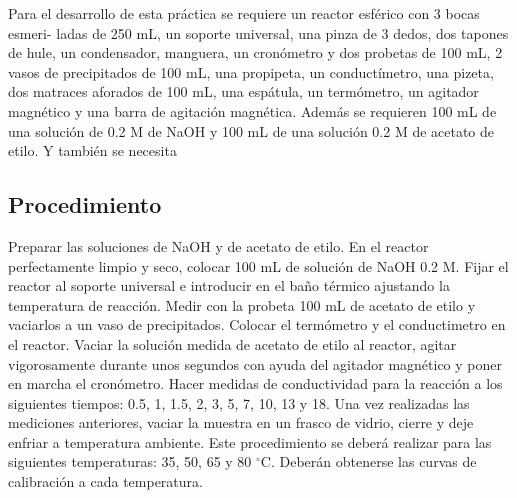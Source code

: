     Para el desarrollo de esta práctica se requiere un reactor esférico con 3 bocas esmeri-
    ladas de 250 mL, un soporte universal, una pinza de 3 dedos, dos tapones de hule, 
    un condensador, manguera, un cronómetro y dos probetas de 100 mL, 2 vasos de 
    precipitados de 100 mL, una propipeta, un conductímetro, una pizeta, dos matraces 
    aforados de 100 mL, una espátula, un termómetro, un agitador magnético y una barra 
    de agitación magnética. Además se requieren 100 mL de una solución de 0.2 M de NaOH 
    y 100 mL de una solución 0.2 M de acetato de etilo. Y también se necesita



    \subsection{Procedimiento}
    
        Preparar las soluciones de NaOH y de acetato de etilo. En el reactor perfectamente
    limpio y seco, colocar 100 mL de solución de NaOH 0.2 M. Fijar el reactor al soporte
    universal e introducir en el baño térmico ajustando la temperatura de reacción. Medir
    con la probeta 100 mL de acetato de etilo y vaciarlos a un vaso de precipitados. Colocar
    el termómetro y el conductimetro en el reactor. Vaciar la solución medida de acetato
    de etilo al reactor, agitar vigorosamente durante unos segundos con ayuda del agitador
    magnético y poner en marcha el cronómetro. Hacer medidas de conductividad para la
    reacción a los siguientes tiempos: 0.5, 1, 1.5, 2, 3, 5, 7, 10, 13 y 18. Una vez realizadas
    las mediciones anteriores, vaciar la muestra en un frasco de vidrio, cierre y deje enfriar
    a temperatura ambiente. Este procedimiento se deberá realizar para las siguientes
    temperaturas: 35, 50, 65 y 80 $^{\circ}$C. Deberán obtenerse las curvas de calibración a cada
    temperatura.

